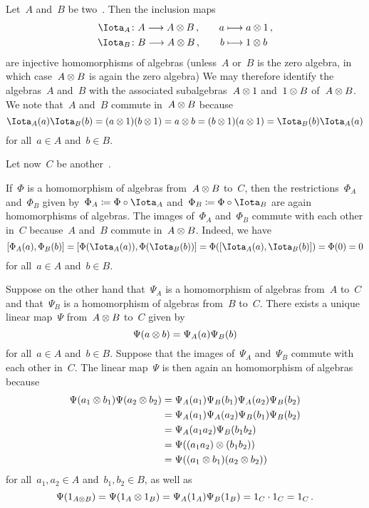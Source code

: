 \begin{recall}
	\label{homomorphism out of a tensor product}
	Let~$A$ and~$B$ be two~{\algebras{$\kf$}}.
	Then the inclusion maps
	\begin{alignat*}{2}
		\Iota_A
		&\colon
		A
		\to
		A \tensor B \,,
		&
		\quad
		a
		&\mapsto
		a \tensor 1 \,,
		\\
		\Iota_B
		&\colon
		B
		\to
		A \tensor B \,,
		&
		\quad
		b
		&\mapsto
		1 \tensor b
	\end{alignat*}
	are injective homomorphisms of algebras (unless~$A$ or~$B$ is the zero algebra, in which case~$A \otimes B$ is again the zero algebra)
	We may therefore identify the algebras~$A$ and~$B$ with the associated subalgebras~$A \otimes 1$ and~$1 \otimes B$ of~$A \otimes B$.
	We note that~$A$ and~$B$ commute in~$A \otimes B$ because
	\[
		\Iota_A(a) \Iota_B(b)
		=
		(a \tensor 1) (b \tensor 1)
		=
		a \tensor b
		=
		(b \tensor 1) (a \tensor 1)
		=
		\Iota_B(b) \Iota_A(a)
	\]
	for all~$a \in A$ and~$b \in B$.
	
	Let now~$C$ be another~\algebra{$\kf$}.
	
	If~$\Phi$ is a homomorphism of algebras from~$A \otimes B$ to~$C$, then the restrictions~$\Phi_A$ and~$\Phi_B$ given by~$\Phi_A \defined \Phi \circ \Iota_A$ and~$\Phi_B \defined \Phi \circ \Iota_B$ are again homomorphisms of algebras.
	The images of~$\Phi_A$ and~$\Phi_B$ commute with each other in~$C$ because~$A$ and~$B$ commute in~$A \otimes B$.
	Indeed, we have
	\[
		[ \Phi_A(a), \Phi_B(b) ]
		=
		[ \Phi(\Iota_A(a)), \Phi(\Iota_B(b)) ]
		=
		\Phi( [ \Iota_A(a), \Iota_B(b) ] )
		=
		\Phi( 0 )
		=
		0
	\]
	for all~$a \in A$ and~$b \in B$.
	
	Suppose on the other hand that~$\Psi_A$ is a homomorphism of algebras from~$A$ to~$C$ and that~$\Psi_B$ is a homomorphism of algebras from~$B$ to~$C$.
	There exists a unique linear map~$\Psi$ from~$A \otimes B$ to~$C$ given by
	\[
		\Psi(a \otimes b)
		=
		\Psi_A(a) \Psi_B(b)
	\]
	for all~$a \in A$ and~$b \in B$.
	Suppose that the images of~$\Psi_A$ and~$\Psi_B$ commute with each other in~$C$.
	The linear map~$\Psi$ is then again an homomorphism of algebras because
	\begin{align*}
		\Psi(a_1 \otimes b_1) \Psi(a_2 \otimes b_2)
		&=
		\Psi_A(a_1) \Psi_B(b_1) \Psi_A(a_2) \Psi_B(b_2)
		\\
		&=
		\Psi_A(a_1) \Psi_A(a_2) \Psi_B(b_1) \Psi_B(b_2)
		\\
		&=
		\Psi_A(a_1 a_2) \Psi_B(b_1 b_2)
		\\
		&=
		\Psi( (a_1 a_2) \otimes (b_1 b_2) )
		\\
		&=
		\Psi( (a_1 \otimes b_1) (a_2 \otimes b_2) )
	\end{align*}
	for all~$a_1, a_2 \in A$ and~$b_1, b_2 \in B$, as well as
	\[
		\Psi( 1_{A \otimes B} )
		=
		\Psi( 1_A \otimes 1_B )
		=
		\Psi_A( 1_A ) \Psi_B( 1_B )
		=
		1_C \cdot 1_C
		=
		1_C \,.
	\]
	

\end{recall}
